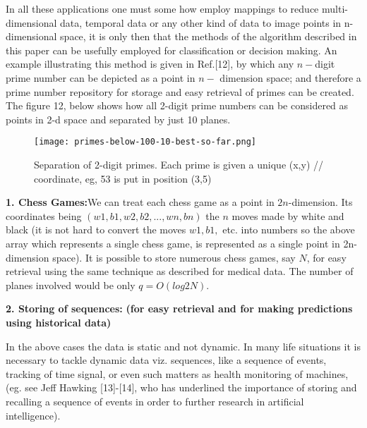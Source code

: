 \documentclass[english]{article}
\begin{document}
In all these applications one must some how employ mappings to reduce
multi-dimensional data, temporal data or any other kind of data to
image points in n-dimensional space, it is only then that the methods
of the algorithm described in this paper can be usefully employed
for classification or decision making. An example illustrating this method is given in Ref.[12], by which any $n-$digit prime number can be depicted as a point in $n-$ dimension space; and therefore a prime number repository for storage and easy retrieval of primes can be created. The figure 12, 
 below shows how all 2-digit prime numbers can be considered as points in 2-d space and separated by just 10 planes.

\medskip{}
\begin{figure}[htp]
 \begin{center}
\texttt{[image: primes-below-100-10-best-so-far.png]}
\caption{Separation of 2-digit primes. Each prime is given a unique (x,y) // coordinate, eg, 53 is put in position (3,5)}

\label{fig:fig-m} \end{center}
\end{figure} 
\medskip{}


\textbf{\large 1. Chess Games:}We can treat each chess game as a point
in $2n$-dimension. Its coordinates being $(w1,b1,w2,b2,...,wn,bn)$
the $n$ moves made by white and black (it is not hard to convert
the moves $w1,b1,$ etc. into numbers so the above array which represents
a single chess game, is represented as a single point in 2n-dimension
space). It is possible to store numerous chess games, say $N$, for
easy retrieval using the same technique as described for medical data.
The number of planes involved would be only $q=O(log2N)$. 

\medskip{}


\textbf{\large 2. Storing of sequences:}\textbf{ (for easy retrieval
and for making predictions using historical data)}

In the above cases the data is static and not dynamic. In many life
situations it is necessary to tackle dynamic data viz. sequences,
like a sequence of events, tracking of time signal, or even such matters
as health monitoring of machines, (eg. see Jeff Hawking {[}13{]}-{[}14{]},
who has underlined the importance of storing and recalling a sequence
of events in order to further research in artificial intelligence).

\medskip{}
\end{document}
